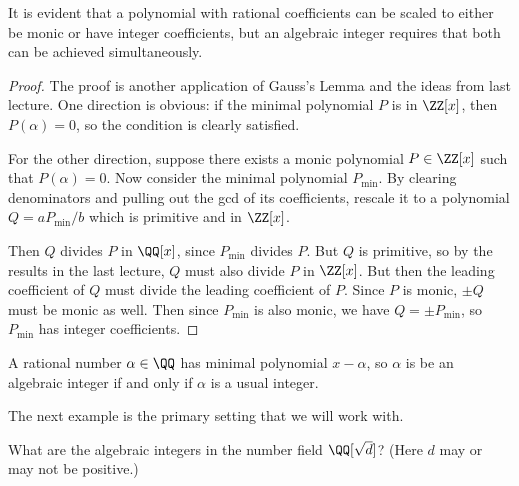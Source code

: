 It is evident that a polynomial with rational coefficients can be scaled to either be monic or have integer coefficients, but an algebraic integer requires that both can be achieved simultaneously.

\begin{proof}
The proof is another application of Gauss's Lemma and the ideas from last lecture. One direction is obvious: if the minimal polynomial $P$ is in $\ZZ[x]$, then $P(\alpha) = 0$, so the condition is clearly satisfied. 

For the other direction, suppose there exists a monic polynomial $P \in \ZZ[x]$ such that $P(\alpha) = 0$. Now consider the minimal polynomial $P_{\min}$. By clearing denominators and pulling out the gcd of its coefficients, rescale it to a polynomial $Q = aP_{\min}/b$ which is primitive and in $\ZZ[x]$. 

Then $Q$ divides $P$ in $\QQ[x]$, since $P_{\min}$ divides $P$. But $Q$ is primitive, so by the results in the last lecture, $Q$ must also divide $P$ in $\ZZ[x]$. But then the leading coefficient of $Q$ must divide the leading coefficient of $P$. Since $P$ is monic, $\pm Q$ must be monic as well. Then since $P_{\min}$ is also monic, we have $Q = \pm P_{\min}$, so $P_{\min}$ has integer coefficients. 
\end{proof}


\begin{example}
A rational number $\alpha \in \QQ$ has minimal polynomial $x - \alpha$, so $\alpha$ is be an algebraic integer if and only if $\alpha$ is a usual integer. 
\end{example}

The next example is the primary setting that we will work with.

\begin{example}
What are the algebraic integers in the number field $\QQ[\sqrt{d}]$? (Here $d$ may or may not be positive.)
\end{example}

